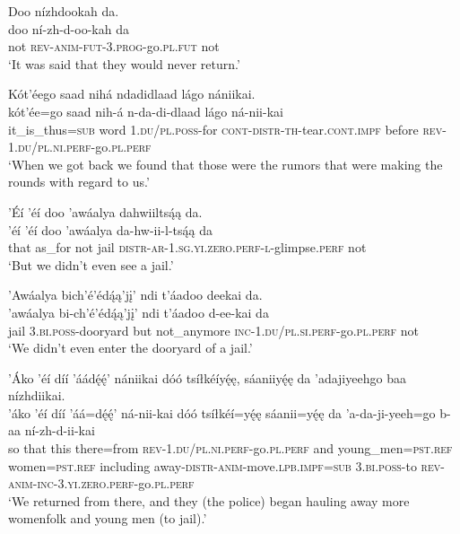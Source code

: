 \ea\label{ex:text7-13-4}
Doo nízhdookah da.\\
\gll doo	ní-zh-d-oo-kah	da\\
     not	\textsc{rev}-\textsc{anim}-\textsc{fut}-3.\textsc{prog}-go.\textsc{pl}.\textsc{fut}	not\\
\glt `It was said that they would never return.'
\z

\ea\label{ex:text7-13-5}
Kót’éego saad nihá ndadidlaad lágo nániikai.\\
\gll kót’ée=go	saad	nih-á	n-da-di-dlaad	lágo	ná-nii-kai\\
     it\_is\_thus=\textsc{sub}	word	1.\textsc{du}/\textsc{pl}.\textsc{poss}-for	\textsc{cont}-\textsc{distr}-\textsc{th}-tear.\textsc{cont}.\textsc{impf}	before	\textsc{rev}-1.\textsc{du}/\textsc{pl}.\textsc{ni}.\textsc{perf}-go.\textsc{pl}.\textsc{perf}\\
\glt `When we got back we found that those were the rumors that were making the rounds with regard to us.'
\z

\ea\label{ex:text7-13-6}
’Éí ’éí doo ’awáalya dahwiiltsą́ą da.\\
\gll ’éí	’éí	doo	’awáalya	da-hw-ii-l-tsą́ą	da\\
     that	as\_for	not	jail	\textsc{distr}-\textsc{ar}-1.\textsc{sg}.\textsc{yi}.\textsc{zero}.\textsc{perf}-\textsc{l}-glimpse.\textsc{perf}	not\\
\glt `But we didn't even see a jail.'
\z

\ea\label{ex:text7-13-7}
’Awáalya bich’é’édą́ą’jį’ ndi t’áadoo deekai da.\\
\gll ’awáalya	bi-ch’é’édą́ą’jį’	ndi	t’áadoo	d-ee-kai	da\\
     jail	3.\textsc{bi}.\textsc{poss}-dooryard	but	not\_anymore	\textsc{inc}-1.\textsc{du}/\textsc{pl}.\textsc{si}.\textsc{perf}-go.\textsc{pl}.\textsc{perf}	not\\
\glt `We didn't even enter the dooryard of a jail.'
\z

\ea\label{ex:text7-14-1}
’Áko ’éí díí ’áádę́ę́’ nániikai dóó tsíłkéíyę́ę, sáaniiyę́ę da ’adajiyeehgo baa nízhdiikai.\\
\gll ’áko	’éí	díí	’áá=dę́ę́’	ná-nii-kai	dóó	tsíłkéí=yę́ę	sáanii=yę́ę	da	’a-da-ji-yeeh=go	b-aa	ní-zh-d-ii-kai\\
     so	that	this	there=from	\textsc{rev}-1.\textsc{du}/\textsc{pl}.\textsc{ni}.\textsc{perf}-go.\textsc{pl}.\textsc{perf}	and	young\_men=\textsc{pst}.\textsc{ref}	women=\textsc{pst}.\textsc{ref}	including	away-\textsc{distr}-\textsc{anim}-move.\textsc{lpb}.\textsc{impf}=\textsc{sub}	3.\textsc{bi}.\textsc{poss}-to	\textsc{rev}-\textsc{anim}-\textsc{inc}-3.\textsc{yi}.\textsc{zero}.\textsc{perf}-go.\textsc{pl}.\textsc{perf}\\
\glt `We returned from there, and they (the police) began hauling away more womenfolk and young men (to jail).'
\z

